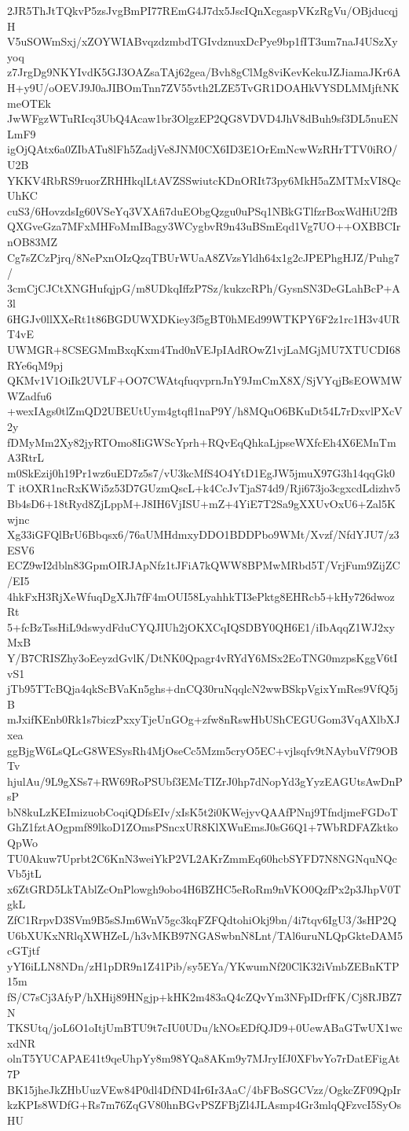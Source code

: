 2JR5ThJtTQkvP5zsJvgBmPI77REmG4J7dx5JscIQnXcgaspVKzRgVu/OBjducqjH
V5uSOWmSxj/xZOYWIABvqzdzmbdTGIvdznuxDcPye9bp1fIT3um7naJ4USzXyyoq
z7JrgDg9NKYIvdK5GJ3OAZsaTAj62gea/Bvh8gClMg8viKevKekuJZJiamaJKr6A
H+y9U/oOEVJ9J0aJIBOmTnn7ZV55vth2LZE5TvGR1DOAHkVYSDLMMjftNKmeOTEk
JwWFgzWTuRIcq3UbQ4Acaw1br3OlgzEP2QG8VDVD4JhV8dBuh9sf3DL5nuENLmF9
igOjQAtx6a0ZIbATu8lFh5ZadjVe8JNM0CX6ID3E1OrEmNcwWzRHrTTV0iRO/U2B
YKKV4RbRS9ruorZRHHkqlLtAVZSSwiutcKDnORIt73py6MkH5aZMTMxVI8QcUhKC
cuS3/6HovzdsIg60VSeYq3VXAfi7duEObgQzgu0uPSq1NBkGTlfzrBoxWdHiU2fB
QXGveGza7MFxMHFoMmIBagy3WCygbvR9n43uBSmEqd1Vg7UO++OXBBCIrnOB83MZ
Cg7sZCzPjrq/8NePxnOIzQzqTBUrWUaA8ZVzsYldh64x1g2cJPEPhgHJZ/Puhg7/
3cmCjCJCtXNGHufqjpG/m8UDkqIffzP7Sz/kukzcRPh/GysnSN3DeGLahBcP+A3l
6HGJv0llXXeRt1t86BGDUWXDKiey3f5gBT0hMEd99WTKPY6F2z1rc1H3v4URT4vE
UWMGR+8CSEGMmBxqKxm4Tnd0nVEJpIAdROwZ1vjLaMGjMU7XTUCDI68RYe6qM9pj
QKMv1V1OiIk2UVLF+OO7CWAtqfuqvprnJnY9JmCmX8X/SjVYqjBsEOWMWWZadfu6
+wexIAgs0tlZmQD2UBEUtUym4gtqfl1naP9Y/h8MQuO6BKuDt54L7rDxvlPXcV2y
fDMyMm2Xy82jyRTOmo8IiGWScYprh+RQvEqQhkaLjpseWXfcEh4X6EMnTmA3RtrL
m0SkEzij0h19Pr1wz6uED7z5s7/vU3kcMfS4O4YtD1EgJW5jmuX97G3h14qqGk0T
itOXR1ncRxKWi5z53D7GUzmQscL+k4CcJvTjaS74d9/Rji673jo3cgxcdLdizhv5
Bb4sD6+18tRyd8ZjLppM+J8IH6VjISU+mZ+4YiE7T2Sa9gXXUvOxU6+Zal5Kwjnc
Xg33iGFQlBrU6Bbqsx6/76aUMHdmxyDDO1BDDPbo9WMt/Xvzf/NfdYJU7/z3ESV6
ECZ9wI2dbln83GpmOIRJApNfz1tJFiA7kQWW8BPMwMRbd5T/VrjFum9ZijZC/EI5
4hkFxH3RjXeWfuqDgXJh7fF4mOUI58LyahhkTI3ePktg8EHRcb5+kHy726dwozRt
5+fcBzTssHiL9dswydFduCYQJIUh2jOKXCqIQSDBY0QH6E1/iIbAqqZ1WJ2xyMxB
Y/B7CRISZhy3oEeyzdGvlK/DtNK0Qpagr4vRYdY6MSx2EoTNG0mzpsKggV6tIvS1
jTb95TTcBQja4qkScBVaKn5ghs+dnCQ30ruNqqlcN2wwBSkpVgixYmRes9VfQ5jB
mJxifKEnb0Rk1s7biczPxxyTjeUnGOg+zfw8nRswHbUShCEGUGom3VqAXlbXJxea
ggBjgW6LsQLcG8WESysRh4MjOseCc5Mzm5cryO5EC+vjlsqfv9tNAybuVf79OBTv
hjulAu/9L9gXSs7+RW69RoPSUbf3EMcTIZrJ0hp7dNopYd3gYyzEAGUtsAwDnPsP
bN8kuLzKEImizuobCoqiQDfsEIv/xIsK5t2i0KWejyvQAAfPNnj9TfndjmeFGDoT
GhZ1fztAOgpmf89lkoD1ZOmsPSncxUR8KlXWuEmsJ0sG6Q1+7WbRDFAZktkoQpWo
TU0Akuw7Uprbt2C6KnN3weiYkP2VL2AKrZmmEq60hcbSYFD7N8NGNquNQcVb5jtL
x6ZtGRD5LkTAblZcOnPlowgh9obo4H6BZHC5eRoRm9nVKO0QzfPx2p3JhpV0TgkL
ZfC1RrpvD3SVm9B5sSJm6WnV5gc3kqFZFQdtohiOkj9bn/4i7tqv6IgU3/3sHP2Q
U6bXUKxNRlqXWHZeL/h3vMKB97NGASwbnN8Lnt/TAl6uruNLQpGkteDAM5cGTjtf
yYI6iLLN8NDn/zH1pDR9n1Z41Pib/sy5EYa/YKwumNf20ClK32iVmbZEBnKTP15m
fS/C7sCj3AfyP/hXHij89HNgjp+kHK2m483aQ4cZQvYm3NFpIDrfFK/Cj8RJBZ7N
TKSUtq/joL6O1oItjUmBTU9t7cIU0UDu/kNOsEDfQJD9+0UewABaGTwUX1wcxdNR
olnT5YUCAPAE41t9qeUhpYy8m98YQa8AKm9y7MJryIfJ0XFbvYo7rDatEFigAt7P
BK15jheJkZHbUuzVEw84P0dl4DfND4Ir6Ir3AaC/4bFBoSGCVzz/OgkcZF09QpIr
kzKPIs8WDfG+Rs7m76ZqGV80hnBGvPSZFBjZl4JLAsmp4Gr3mlqQFzvcI5SyOsHU
